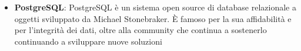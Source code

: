\begin{itemize}
    \item \textbf{PostgreSQL}: PostgreSQL è un sistema open source di database relazionale 
    a oggetti sviluppato da Michael Stonebraker. È famoso per la sua affidabilità e per 
    l'integrità dei dati, oltre alla community che continua a sostenerlo continuando
    a sviluppare nuove soluzioni
    \cite{PostgreSQL}
    

\end{itemize}